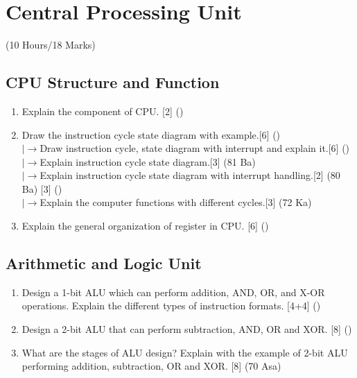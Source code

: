 \documentclass[12pt]{article}
\newcommand{\lb}{\\$\left|\rightarrow\right.$}
\begin{document}
	\pagebreak
\section{Central Processing Unit}
	\begin{center}(10 Hours/18 Marks)\end{center}
	\subsection{CPU Structure and Function}
	\begin{enumerate}[noitemsep, topsep = 0pt]
		\item Explain the component of CPU. \hfill [2] ()
	\item Draw the instruction cycle state diagram with example.\hfill[6] ()
	\lb Draw instruction cycle, state diagram with interrupt and explain it.\hfill[6] ()
	\lb Explain instruction cycle state diagram.\hfill[3] (81 Ba)
	\lb Explain instruction cycle state diagram with interrupt handling.\hfill[2] (80 Ba) [3] ()
	\lb Explain the computer functions with different cycles.\hfill[3] (72 Ka)

		\item Explain the general organization of register in CPU. \hfill [6] ()
	\end{enumerate}
	\subsection{Arithmetic and Logic Unit}
	\begin{enumerate}[noitemsep, topsep = 0pt]
		\item Design a 1-bit ALU which can perform addition, AND, OR, and X-OR operations. Explain the different types of instruction formats. \hfill [4+4] ()
		
		\item Design a 2-bit ALU that can perform subtraction, AND, OR and XOR. \hfill [8] ()
		
		\item What are the stages of ALU design? Explain with the example of 2-bit ALU performing addition, subtraction, OR and XOR. \hfill [8] (70 Asa)
	\end{enumerate}
\end{document}
